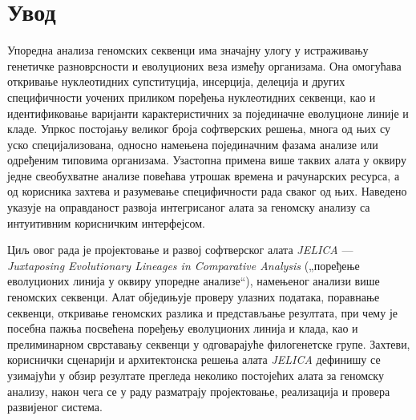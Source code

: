 \documentclass[12pt,oneside]{memoir}
\begin{document}
\frontmatter
\naslovna
\komisija
\apstrakt
\tableofcontents*

\mainmatter

\chapter{Увод}
Упоредна анализа геномских секвенци има значајну улогу у истраживању генетичке разноврсности и еволуционих веза између организама. Она омогућава откривање нуклеотидних супституција, инсерција, делеција и других специфичности уочених приликом поређења нуклеотидних секвенци, као и идентификовање варијанти карактеристичних за појединачне еволуционе линије и кладе. Упркос постојању великог броја софтверских решења, многа од њих су уско специјализована, односно намењена појединачним фазама анализе или одређеним типовима организама. Узастопна примена више таквих алата у оквиру једне свеобухватне анализе повећава утрошак времена и рачунарских ресурса, а од корисника захтева и разумевање специфичности рада сваког од њих. Наведено указује на оправданост развоја интегрисаног алата за геномску анализу са интуитивним корисничким интерфејсом.

Циљ овог рада је пројектовање и развој софтверског алата \textit{JELICA} — \textit{Juxtaposing Evolutionary Lineages in Comparative Analysis} („поређење еволуционих линија у оквиру упоредне анализе“), намењеног анализи више геномских секвенци. Алат обједињује проверу улазних података, поравнање секвенци, откривање геномских разлика и представљање резултата, при чему је посебна пажња посвећена поређењу еволуционих линија и клада, као и прелиминарном сврставању секвенци у одговарајуће филогенетске групе. Захтеви, кориснички сценарији и архитектонска решења алата \textit{JELICA} дефинишу се узимајући у обзир резултате прегледа неколико постојећих алата за геномску анализу, након чега се у раду разматрају пројектовање, реализација и провера развијеног система.
\end{document}
